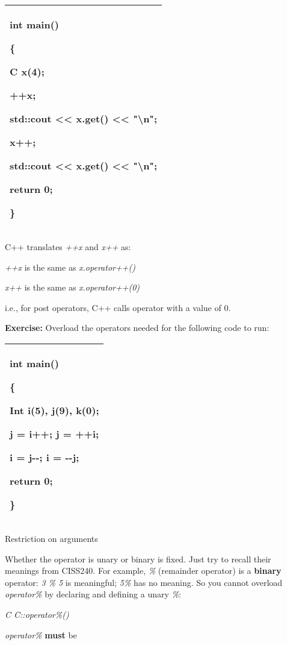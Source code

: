 \documentclass[
]{article}
\begin{document}
\begin{longtable}[]{@{}l@{}}
\toprule
\endhead
\begin{minipage}[t]{0.97\columnwidth}\raggedright
int main()

\{

C x(4);

++x;

std::cout \textless\textless{} x.get() \textless\textless{}
"\textbackslash n";

x++;

std::cout \textless\textless{} x.get() \textless\textless{}
"\textbackslash n";

return 0;

\}\strut
\end{minipage}\tabularnewline
\bottomrule
\end{longtable}

C++ translates \emph{++x} and \emph{x++} as:

\emph{++x} is the same as \emph{x.operator++()}

\emph{x++} is the same as \emph{x.operator++(0)}

i.e., for post operators, C++ calls operator with a value of 0.

\textbf{Exercise:} Overload the operators needed for the following code
to run:

\begin{longtable}[]{@{}l@{}}
\toprule
\endhead
\begin{minipage}[t]{0.97\columnwidth}\raggedright
int main()

\{

Int i(5), j(9), k(0);

j = i++; j = ++i;

i = j-\/-; i = -\/-j;

return 0;

\}\strut
\end{minipage}\tabularnewline
\bottomrule
\end{longtable}

Restriction on arguments

Whether the operator is unary or binary is fixed. Just try to recall
their meanings from CISS240. For example, \emph{\%} (remainder operator)
is a \textbf{binary} operator: \emph{3 \% 5} is meaningful; \emph{5\%}
has no meaning. So you cannot overload \emph{operator\%} by declaring
and defining a unary \emph{\%}:

\emph{C C::operator\%()}

\emph{operator\%} \textbf{must} be
\end{document}
